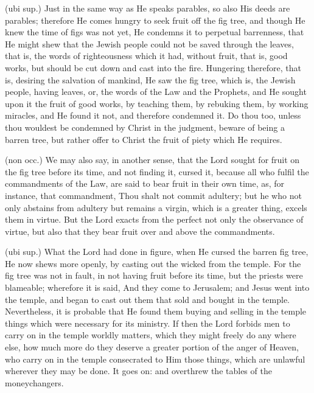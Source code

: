  (ubi sup.) Just in the same way as He speaks parables, so also His deeds are parables; therefore He comes hungry to seek fruit off the fig tree, and though He knew the time of figs was not yet, He condemns it to perpetual barrenness, that He might shew that the Jewish people could not be saved through the leaves, that is, the words of righteousness which it had, without fruit, that is, good works, but should be cut down and cast into the fire. Hungering therefore, that is, desiring the salvation of mankind, He saw the fig tree, which is, the Jewish people, having leaves, or, the words of the Law and the Prophets, and He sought upon it the fruit of good works, by teaching them, by rebuking them, by working miracles, and He found it not, and therefore condemned it. Do thou too, unless thou wouldest be condemned by Christ in the judgment, beware of being a barren tree, but rather offer to Christ the fruit of piety which He requires.

 (non occ.) We may also say, in another sense, that the Lord sought for fruit on the fig tree before its time, and not finding it, cursed it, because all who fulfil the commandments of the Law, are said to bear fruit in their own time, as, for instance, that commandment, Thou shalt not commit adultery; but he who not only abstains from adultery but remains a virgin, which is a greater thing, excels them in virtue. But the Lord exacts from the perfect not only the observance of virtue, but also that they bear fruit over and above the commandments.

 

 (ubi sup.) What the Lord had done in figure, when He cursed the barren fig tree, He now shews more openly, by casting out the wicked from the temple. For the fig tree was not in fault, in not having fruit before its time, but the priests were blameable; wherefore it is said, And they come to Jerusalem; and Jesus went into the temple, and began to cast out them that sold and bought in the temple. Nevertheless, it is probable that He found them buying and selling in the temple things which were necessary for its ministry. If then the Lord forbids men to carry on in the temple worldly matters, which they might freely do any where else, how much more do they deserve a greater portion of the anger of Heaven, who carry on in the temple consecrated to Him those things, which are unlawful wherever they may be done. It goes on: and overthrew the tables of the moneychangers.

